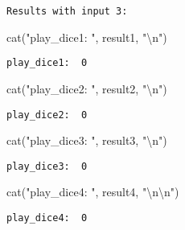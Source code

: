 \documentclass[
  letterpaper,
  DIV=11,
  numbers=noendperiod]{scrartcl}
\newenvironment{Shaded}{\begin{snugshade}}{\end{snugshade}}
\newcommand{\FunctionTok}[1]{\textcolor[rgb]{0.28,0.35,0.67}{#1}}
\newcommand{\NormalTok}[1]{\textcolor[rgb]{0.00,0.23,0.31}{#1}}
\newcommand{\SpecialCharTok}[1]{\textcolor[rgb]{0.37,0.37,0.37}{#1}}
\newcommand{\StringTok}[1]{\textcolor[rgb]{0.13,0.47,0.30}{#1}}
\begin{document}
\begin{verbatim}
Results with input 3:
\end{verbatim}

\begin{Shaded}
\begin{Highlighting}[]
\FunctionTok{cat}\NormalTok{(}\StringTok{"play\_dice1: "}\NormalTok{, result1, }\StringTok{"}\SpecialCharTok{\textbackslash{}n}\StringTok{"}\NormalTok{)}
\end{Highlighting}
\end{Shaded}

\begin{verbatim}
play_dice1:  0 
\end{verbatim}

\begin{Shaded}
\begin{Highlighting}[]
\FunctionTok{cat}\NormalTok{(}\StringTok{"play\_dice2: "}\NormalTok{, result2, }\StringTok{"}\SpecialCharTok{\textbackslash{}n}\StringTok{"}\NormalTok{)}
\end{Highlighting}
\end{Shaded}

\begin{verbatim}
play_dice2:  0 
\end{verbatim}

\begin{Shaded}
\begin{Highlighting}[]
\FunctionTok{cat}\NormalTok{(}\StringTok{"play\_dice3: "}\NormalTok{, result3, }\StringTok{"}\SpecialCharTok{\textbackslash{}n}\StringTok{"}\NormalTok{)}
\end{Highlighting}
\end{Shaded}

\begin{verbatim}
play_dice3:  0 
\end{verbatim}

\begin{Shaded}
\begin{Highlighting}[]
\FunctionTok{cat}\NormalTok{(}\StringTok{"play\_dice4: "}\NormalTok{, result4, }\StringTok{"}\SpecialCharTok{\textbackslash{}n\textbackslash{}n}\StringTok{"}\NormalTok{)}
\end{Highlighting}
\end{Shaded}

\begin{verbatim}
play_dice4:  0 
\end{verbatim}
\end{document}
